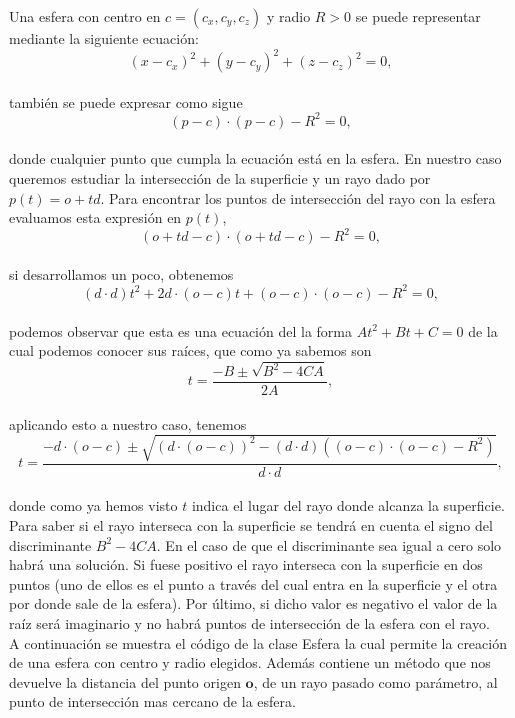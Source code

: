 Una esfera con centro en $c = (c_x, c_y, c_z)$ y radio $R>0$ se puede representar mediante la siguiente ecuación:
${ }$\\
\[
	(x-c_x)^2 + (y-c_y)^2 + (z-c_z)^2 = 0,
\]
${ }$\\
también se puede expresar como sigue
${ }$\\
\[
	(p-c)\cdot(p-c) - R^2 = 0,
\]
${ }$\\
donde cualquier punto que cumpla la ecuación está en la esfera. En nuestro caso queremos estudiar la intersección de la superficie y un rayo dado por $p(t) = o + td$. Para encontrar los puntos de intersección del rayo con la esfera evaluamos esta expresión en $p(t)$,
${ }$\\
\[
	(o+td-c)\cdot(o+td-c) - R^2 = 0,
\]
${ }$\\
si desarrollamos un poco, obtenemos
${ }$\\
\[
	(d\cdot d)t^2 + 2d\cdot (o-c)t + (o-c)\cdot(o-c) - R^2 = 0,
\]
${ }$\\
podemos observar que esta es una ecuación del la forma $At^2+Bt+C=0$ de la cual podemos conocer sus raíces, que como ya sabemos son
${ }$\\
\[
	t = \frac{-B\pm \sqrt{B^2-4CA}}{2A},
\]
${ }$\\
aplicando esto a nuestro caso, tenemos
${ }$\\
\[
	t = \frac{-d\cdot (o-c) \pm \sqrt{(d\cdot (o-c))^2 - (d\cdot d)((o-c)\cdot(o-c)-R^2)}}{d\cdot d},
\]
${ }$\\
donde como ya hemos visto $t$ indica el lugar del rayo donde alcanza la superficie.
${ }$\\

Para saber si el rayo interseca con la superficie se tendrá en cuenta el signo del discriminante $B^2-4CA$. En el caso de que el discriminante sea igual a cero solo habrá una solución. Si fuese positivo el rayo interseca con la superficie en dos puntos (uno de ellos es el punto a través del cual entra en la superficie y el otra por donde sale de la esfera). Por último, si dicho valor es negativo el valor de la raíz será imaginario y no habrá puntos de intersección de la esfera con el rayo.
	${ }$\\	
	
A continuación se muestra el código de la clase Esfera la cual permite la creación de una esfera con centro y radio elegidos. Además contiene un método que nos devuelve la distancia del punto origen $\textbf{o}$, de un rayo pasado como parámetro, al punto de intersección mas cercano de la esfera.
${ }$\\

